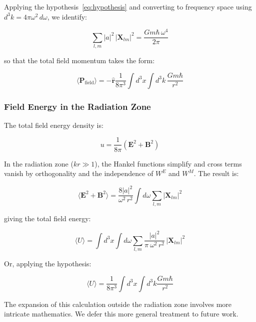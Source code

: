 \documentclass {article}
\renewcommand\vec{\mathbf}
\let\OldHat\hat
\renewcommand{\hat}[1]{\OldHat{\mathbf{#1}}}
\begin{document}
Applying the hypothesis~\eqref{eq:hypothesis} and converting to frequency space using $d^3k = 4\pi\omega^2\,d\omega$, we identify:

\begin{equation}
\sum_{l,m} |a|^2\, |\vec{X}_{lm}|^2 = \frac {Gm\hbar\, \omega^4}{2 \pi}
\label{eq:identification}
\end{equation}

\noindent so that the total field momentum takes the form:

\begin{equation}
\boxed{
	\langle \vec{P}_{\text{field}} \rangle = -\hat{r} \frac 1 {8 \pi^3}\int d^3x \int d^3k\, \frac{Gm\hbar}{r^2}
}
\label{eq:momentum}
\end{equation}


\subsubsection{Field Energy in the Radiation Zone}

The total field energy density is:

\begin{equation}
u = \frac{1}{8\pi}(\vec{E}^2 + \vec{B}^2)
\end{equation}

\noindent In the radiation zone ($kr \gg 1$), the Hankel functions simplify and cross terms vanish by orthogonality and the independence of $W^E$ and $W^M$. The result is:

\begin{equation}
\langle \vec{E}^2 + \vec{B}^2 \rangle = \frac{8|a|^2}{\omega^2\, r^2} \int d\omega \sum_{l,m} |\vec{X}_{lm}|^2
\end{equation}

\noindent giving the total field energy:

\begin{equation}
	\langle U \rangle =  \int d^3x \int d\omega \sum_{l,m} \frac{|a|^2}{\pi ~ \omega^2\, r^2}\, |\vec{X}_{lm}|^2
\end{equation}

Or, applying the hypothesis:

\begin{equation}
\boxed{
	\langle U \rangle =  \frac 1 { 8 \pi^3} \int d^3x \int d^3k \frac{Gm\hbar}{r^2}
}
\label{eq:energy}
\end{equation}



The expansion of this calculation outside the radiation zone involves more intricate mathematics. We defer this more general treatment to future work.
\end{document}
